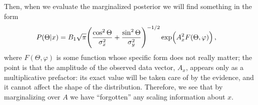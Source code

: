 \documentclass[main.tex]{subfiles}
\begin{document}
Then, when we  evaluate the marginalized posterior we will find something in the form
%
\begin{align}
P(\Theta | x) &= B_1 \sqrt{\pi } \qty( \frac{\cos^2\Theta }{\sigma_x^2} + \frac{\sin^2 \Theta }{\sigma _y^2})^{-1/2}
\exp( A_x^2 F(\Theta , \varphi ))
\,,
\end{align}
%
where \(F (\Theta , \varphi )\) is some function whose specific form does not really matter; the point is that the amplitude of the observed data vector, \(A_x\), appears only as a multiplicative prefactor: its exact value will be taken care of by the evidence, and it cannot affect the shape of the distribution. 
Therefore, we see that by marginalizing over \(A\) we have ``forgotten'' any scaling information about \(x\). 
\end{document}

